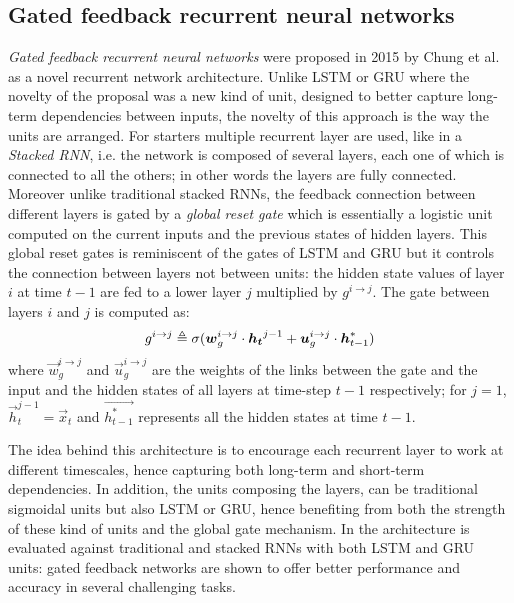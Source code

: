 \subsection{Gated feedback recurrent neural networks}

\textit{Gated feedback recurrent neural networks} were proposed in 2015 by  Chung et al. \cite{gatedFeedback} as a novel recurrent network architecture.
Unlike LSTM or GRU where the novelty of the proposal was a new kind of unit, designed to better capture long-term dependencies between inputs, the novelty of this approach is the way the units are arranged. For starters multiple recurrent layer are used, like in a \textit{Stacked RNN}, i.e. the network is composed of several layers, each one of which is connected to all the others; in other words the layers are fully connected. Moreover unlike traditional stacked RNNs, the feedback connection between different layers is gated by a \textit{global reset gate} which is essentially a logistic unit computed on the current inputs and the previous states of hidden layers. This global reset gates is reminiscent of the gates of LSTM and GRU but it controls the connection between layers not between units: the hidden state values of layer $i$ at time $t-1$ are fed to a lower layer $j$ multiplied by $g^{i\rightarrow j}$.
The gate between layers $i$ and $j$ is computed as:
\begin{equation}
g^{i\rightarrow j} \triangleq \sigma(\boldsymbol{w}_g^{i\rightarrow j} \cdot \boldsymbol{h_t}^{j-1} + \boldsymbol{u}_g^{i\rightarrow j} \cdot \boldsymbol{h}^*_{t-1})
\end{equation}
where $\vec{w}_g^{i\rightarrow j}$ and $\vec{u}_g^{i\rightarrow j}$ are the weights of the links between the gate and the input and the hidden states of all layers at time-step $t-1$ respectively; for $j=1$,  $\vec{h}_t^{j-1}=\vec{x}_t $  and $\vec{h^*_{t-1}}$ represents all the hidden states at time $t-1$.

The idea behind this architecture is to encourage each recurrent layer to work at different timescales, hence capturing both long-term and short-term dependencies. In addition, the units composing the layers, can be traditional sigmoidal units but also LSTM or GRU, hence benefiting from both the strength of these kind of units and the global gate mechanism. In \cite{gatedFeedback} the architecture is evaluated against traditional and stacked RNNs with both LSTM and GRU units: gated feedback networks are shown to offer better performance and accuracy in several challenging tasks.


